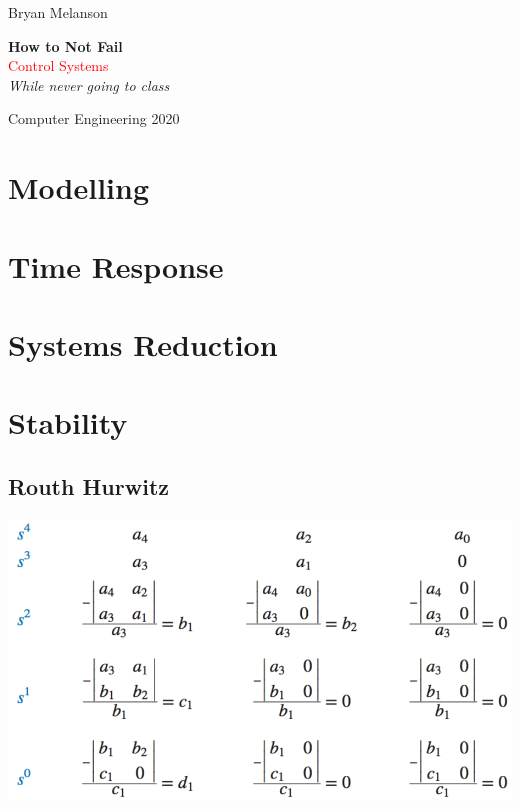 \documentclass[11pt]{article}
\newcommand*{\plogo}{\fbox{$\mathcal{BM}$}}
\begin{document}
 
        
    \begin{titlepage}
    
        \raggedleft
        
        \vspace*{\baselineskip}
        
        {\Large Bryan Melanson}
        
        \vspace*{0.167\textheight}
        
        \textbf{\LARGE How to Not Fail}\\[\baselineskip]
        
        {\textcolor{Red}{\Huge Control Systems}}\\[\baselineskip]
        
        {\Large \textit{While never going to class}}
        
        \vfill
        
        {\large Computer Engineering 2020 ~~\plogo}
        
        \vspace*{3\baselineskip}
    
    \end{titlepage}

    \pagebreak
    
    \tableofcontents

    \section{Modelling}
    \section{Time Response}
    \section{Systems Reduction}
    \section{Stability}
    \subsection{Routh Hurwitz}
    \begin{center}
        \includegraphics[width = 300 px]{img/routh}        
    \end{center}
\end{document}
